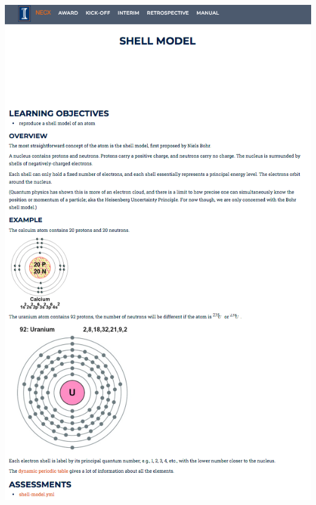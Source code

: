 \documentclass[final]{beamer}
\newlength{\onecolwid}
\newlength{\threecolwid}
\begin{document}
\begin{frame}[t]
\begin{columns}[t,totalwidth=\threecolwid]
\begin{column}{\onecolwid}
                \vspace{0.5in}
		\includegraphics[height=12in]{shell.png}



\end{column}
\end{columns}
\end{frame}
\end{document}
